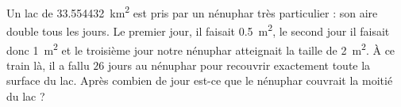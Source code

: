
\begin{exercice}\label{exosmath-0906}

    Un lac de \SI{33.554432}{\kilo\meter\squared} est pris par un nénuphar très particulier : son aire double tous les jours. Le premier jour, il faisait \SI{0.5}{\meter\squared}, le second jour il faisait donc \SI{1}{\meter\squared} et le troisième jour notre nénuphar atteignait la taille de \SI{2}{\meter\squared}. À ce train là, il a fallu \( 26\) jours au nénuphar pour recouvrir exactement toute la surface du lac. Après combien de jour est-ce que le nénuphar couvrait la moitié du lac ?

\end{exercice}
